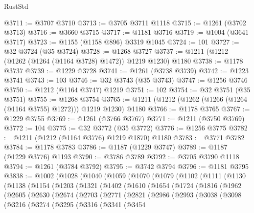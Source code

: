 \begin{lexlean}{RustStd}
\begin{coremodule}
@3711 := @3707 @3710
@3713 := @3705 @3711 @1118
@3715 := @1261 (@3702 @3713)
@3716 := @3660 @3715
@3717 := @1181 @3716
@3719 := @1004 (@3641 @3717)
@3723 := @1155 (@1158 @896) @3319 @1045
@3724 := 101
@3727 := @32 @3724 (@35 @3724)
@3728 := @1268 @3727
@3737 := @1211 (@1212 (@1262 (@1264 (@1164 @3728) @1472)) @1219 @1230) @1180
@3738 := @1178 @3737
@3739 := @1229 @3728
@3741 := @1261 (@3738 @3739)
@3742 := @1223 @3741
@3743 := 103
@3746 := @32 @3743 (@35 @3743)
@3747 := @1256 @3746
@3750 := @1212 (@1164 @3747) @1219
@3751 := 102
@3754 := @32 @3751 (@35 @3751)
@3755 := @1268 @3754
@3765 := @1211 (@1212 (@1262 (@1266 (@1264 (@1164 @3755) @1272))) @1219 @1230) @1180
@3766 := @1178 @3765
@3767 := @1229 @3755
@3769 := @1261 (@3766 @3767)
@3771 := @1211 (@3750 @3769)
@3772 := 104
@3775 := @32 @3772 (@35 @3772)
@3776 := @1256 @3775
@3782 := @1211 (@1212 (@1164 @3776) @1219 @1870) @1180
@3783 := @3771 @3782
@3784 := @1178 @3783
@3786 := @1187 (@1229 @3747)
@3789 := @1187 (@1229 @3776) @1193
@3790 := @3786 @3789
@3792 := @3705 @3790 @1118
@3794 := @1261 (@3784 @3792)
@3795 := @3742 @3794
@3796 := @1181 @3795
@3838 := @1002
    (@1028
      (@1040
        (@1059
          (@1070
            (@1079
              (@1102
                (@1111
                  (@1130
                    (@1138
                      (@1154
                        (@1203
                          (@1321
                            (@1402
                              (@1610
                                (@1654
                                  (@1724
                                    (@1816
                                      (@1962
                                        (@2605
                                          (@2630
                                            (@2674
                                              (@2703
                                                (@2771
                                                  (@2821
                                                    (@2986
                                                      (@2993
                                                        (@3038
                                                          (@3098
                                                            (@3216
                                                              (@3274
                                                                (@3295
                                                                  (@3316
                                                                    (@3341
                                                                      (@3454

\end{coremodule}
\end{lexlean}

